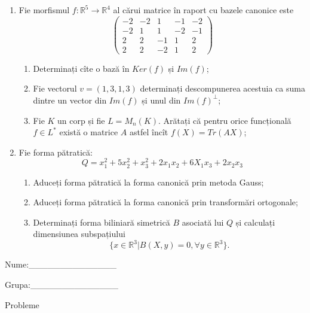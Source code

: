 \documentclass{article}
\begin{document}
\begin{enumerate}
 \item Fie morfismul $f:\mathbb{R}^5 \to \mathbb{R}^4$ al cărui matrice în raport cu bazele canonice este
$$\begin{pmatrix}
-2&-2&1&-1&-2\\
-2&1&1&-2&-1\\
2&2&-1&1&2\\
2&2&-2&1&2
\end{pmatrix}$$

\begin{enumerate}
\item Determinați cîte o bază în $Ker(f)$ și $Im(f)$;
\item Fie vectorul $v=(1,3,1,3)$ determinați descompunerea acestuia ca suma dintre un vector din $Im(f)$ și unul din $Im(f)^\perp$;
\item Fie $K$ un corp și fie $L=M_n(K)$. Arătați că pentru orice funcțională $f \in L^*$ există o matrice $A$ astfel încît $f(X)=Tr(AX)$;
\end{enumerate}
\item Fie forma pătratică:
$$Q= x_1^2+5x_2^2+x_3^2+2x_1x_2+6X_1x_3+2x_2x_3$$

\begin{enumerate}
\item Aduceți forma pătratică la forma canonică prin metoda Gauss;
\item Aduceți forma pătratică la forma canonică prin transformări ortogonale;
\item Determinați forma biliniară simetrică $B$ asociată lui $Q$ și calculați dimensiunea subspațiului
$$\{x \in \mathbb{R}^3 | B(X,y)=0,\forall y \in \mathbb{R}^3\}.$$

\end{enumerate}
\end{enumerate}
\newpage
\begin{flushright}
Nume:\_\_\_\_\_\_\_\_\_\_\_\_\_\_
 
 
Grupa:\_\_\_\_\_\_\_\_\_\_\_\_\_\_
\end{flushright}
\begin{center}
\vspace{2cm}
{\Large Probleme}
\vspace{2cm}
\end{center}
\end{document}

